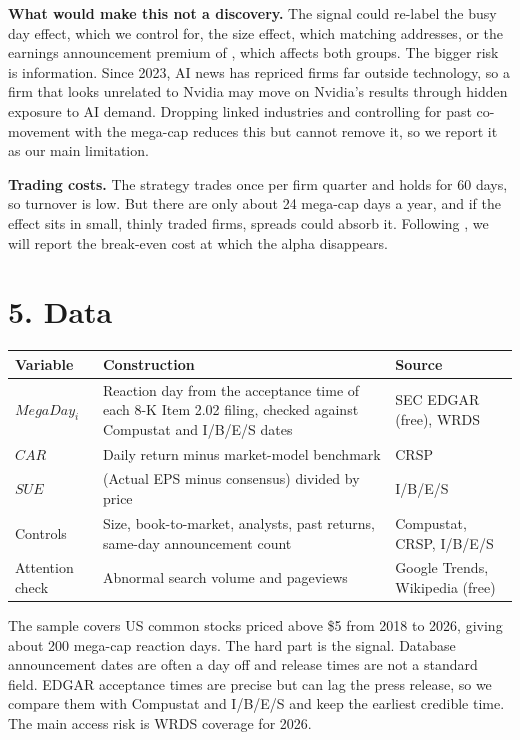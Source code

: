 \documentclass[11pt]{article}
\newcommand{\CAR}{\mathit{CAR}}
\newcommand{\SUE}{\mathit{SUE}}
\newcommand{\Treat}{\mathit{MegaDay}}
\begin{document}
\textbf{What would make this not a discovery.} The signal could re-label the busy day effect, which we control for, the size effect, which matching addresses, or the earnings announcement premium of \citet{savor2016earnings}, which affects both groups. The bigger risk is information. Since 2023, AI news has repriced firms far outside technology, so a firm that looks unrelated to Nvidia may move on Nvidia's results through hidden exposure to AI demand. Dropping linked industries and controlling for past co-movement with the mega-cap reduces this but cannot remove it, so we report it as our main limitation.

\textbf{Trading costs.} The strategy trades once per firm quarter and holds for 60 days, so turnover is low. But there are only about 24 mega-cap days a year, and if the effect sits in small, thinly traded firms, spreads could absorb it. Following \citet{novymarx2016taxonomy}, we will report the break-even cost at which the alpha disappears.

\section*{5. Data}

\begin{table}[h]
\centering
\small
\begin{tabularx}{\textwidth}{@{}l X X@{}}
\toprule
Variable & Construction & Source \\
\midrule
$\Treat_i$ & Reaction day from the acceptance time of each 8-K Item 2.02 filing, checked against Compustat and I/B/E/S dates & SEC EDGAR (free), WRDS \\
$\CAR$ & Daily return minus market-model benchmark & CRSP \\
$\SUE$ & (Actual EPS minus consensus) divided by price & I/B/E/S \\
Controls & Size, book-to-market, analysts, past returns, same-day announcement count & Compustat, CRSP, I/B/E/S \\
Attention check & Abnormal search volume and pageviews & Google Trends, Wikipedia (free) \\
\bottomrule
\end{tabularx}
\end{table}

The sample covers US common stocks priced above \$5 from 2018 to 2026, giving about 200 mega-cap reaction days. The hard part is the signal. Database announcement dates are often a day off and release times are not a standard field. EDGAR acceptance times are precise but can lag the press release, so we compare them with Compustat and I/B/E/S and keep the earliest credible time. The main access risk is WRDS coverage for 2026.
\end{document}
